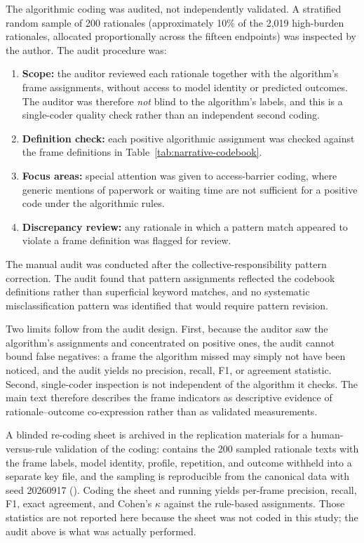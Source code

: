 \documentclass[11pt]{article}
\begin{document}
The algorithmic coding was audited, not independently validated. A stratified random sample of 200 rationales (approximately 10\% of the 2,019 high-burden rationales, allocated proportionally across the fifteen endpoints) was inspected by the author. The audit procedure was:

\begin{enumerate}
\item \textbf{Scope:} the auditor reviewed each rationale together with the algorithm's frame assignments, without access to model identity or predicted outcomes. The auditor was therefore \emph{not} blind to the algorithm's labels, and this is a single-coder quality check rather than an independent second coding.
\item \textbf{Definition check:} each positive algorithmic assignment was checked against the frame definitions in Table~\ref{tab:narrative-codebook}.
\item \textbf{Focus areas:} special attention was given to access-barrier coding, where generic mentions of paperwork or waiting time are not sufficient for a positive code under the algorithmic rules.
\item \textbf{Discrepancy review:} any rationale in which a pattern match appeared to violate a frame definition was flagged for review.
\end{enumerate}

The manual audit was conducted after the collective-responsibility pattern correction. The audit found that pattern assignments reflected the codebook definitions rather than superficial keyword matches, and no systematic misclassification pattern was identified that would require pattern revision.

Two limits follow from the audit design. First, because the auditor saw the algorithm's assignments and concentrated on positive ones, the audit cannot bound false negatives: a frame the algorithm missed may simply not have been noticed, and the audit yields no precision, recall, F1, or agreement statistic. Second, single-coder inspection is not independent of the algorithm it checks. The main text therefore describes the frame indicators as descriptive evidence of rationale--outcome co-expression rather than as validated measurements.

A blinded re-coding sheet is archived in the replication materials for a human-versus-rule validation of the coding:  contains the 200 sampled rationale texts with the frame labels, model identity, profile, repetition, and outcome withheld into a separate key file, and the sampling is reproducible from the canonical data with seed 20260917 (). Coding the sheet and running  yields per-frame precision, recall, F1, exact agreement, and Cohen's \(\kappa\) against the rule-based assignments. Those statistics are not reported here because the sheet was not coded in this study; the audit above is what was actually performed.
\end{document}
